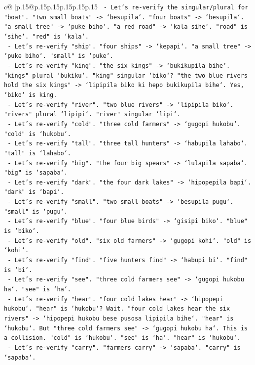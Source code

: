 \documentclass{article}
\begin{document}
{\begin{supertabular}{c@{$\;$}|p{.15\linewidth}@{}p{.15\linewidth}p{.15\linewidth}p{.15\linewidth}p{.15\linewidth}p{.15\linewidth}}
{{{\texttt{  {-} Let's re{-}verify the singular/plural for "boat". "two small boats" {-}> `besupila`. "four boats" {-}> `besupila`. "a small tree" {-}> `puke biho`. "a red road" {-}> `kala sihe`. "road" is `sihe`. "red" is `kala`.} \\
\texttt{  {-} Let's re{-}verify "ship". "four ships" {-}> `kepapi`. "a small tree" {-}> `puke biho`. "small" is `puke`.} \\
\texttt{  {-} Let's re{-}verify "king". "the six kings" {-}> `bukikupila bihe`. "kings" plural `bukiku`. "king" singular `biko`? "the two blue rivers hold the six kings" {-}> `lipipila biko ki hepo bukikupila bihe`. Yes, `biko` is king.} \\
\texttt{  {-} Let's re{-}verify "river". "two blue rivers" {-}> `lipipila biko`. "rivers" plural `lipipi`. "river" singular `lipi`.} \\
\texttt{  {-} Let's re{-}verify "cold". "three cold farmers" {-}> `gugopi hukobu`. "cold" is `hukobu`.} \\
\texttt{  {-} Let's re{-}verify "tall". "three tall hunters" {-}> `habupila lahabo`. "tall" is `lahabo`.} \\
\texttt{  {-} Let's re{-}verify "big". "the four big spears" {-}> `lulapila sapaba`. "big" is `sapaba`.} \\
\texttt{  {-} Let's re{-}verify "dark". "the four dark lakes" {-}> `hipopepila bapi`. "dark" is `bapi`.} \\
\texttt{  {-} Let's re{-}verify "small". "two small boats" {-}> `besupila pugu`. "small" is `pugu`.} \\
\texttt{  {-} Let's re{-}verify "blue". "four blue birds" {-}> `gisipi biko`. "blue" is `biko`.} \\
\texttt{  {-} Let's re{-}verify "old". "six old farmers" {-}> `gugopi kohi`. "old" is `kohi`.} \\
\texttt{  {-} Let's re{-}verify "find". "five hunters find" {-}> `habupi bi`. "find" is `bi`.} \\
\texttt{  {-} Let's re{-}verify "see". "three cold farmers see" {-}> `gugopi hukobu ha`. "see" is `ha`.} \\
\texttt{  {-} Let's re{-}verify "hear". "four cold lakes hear" {-}> `hipopepi hukobu`. "hear" is `hukobu`? Wait. "four cold lakes hear the six rivers" {-}> `hipopepi hukobu bese pusosa lipipila bihe`. "hear" is `hukobu`. But "three cold farmers see" {-}> `gugopi hukobu ha`. This is a collision. "cold" is `hukobu`. "see" is `ha`. "hear" is `hukobu`.} \\
\texttt{  {-} Let's re{-}verify "carry". "farmers carry" {-}> `sapaba`. "carry" is `sapaba`.} \\
}}}
\end{supertabular}}
\end{document}
